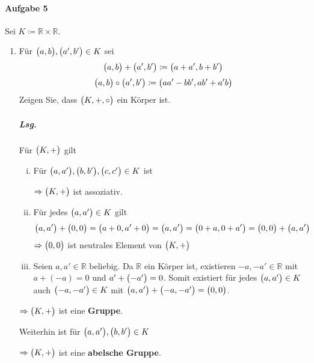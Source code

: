 \documentclass{scrreprt}
\begin{document}
\paragraph{Aufgabe 5} Sei $K \coloneqq \mathbb{R} \times \mathbb{R}$.
\begin{enumerate}[(1)]
\item Für $\qty\big(a, b), \qty\big(a', b') \in K$ sei
  \[
    \qty\big(a, b) + \qty\big(a', b') \coloneqq \qty\big(a + a', b + b')
  \]
  \[
    \qty\big(a, b) \circ \qty\big(a', b') \coloneqq
    \qty\big(aa' - bb', ab' + a'b)
  \]
  Zeigen Sie, dass $\qty\big(K, +, \circ)$ ein Körper ist.

  \subparagraph{Lsg.} Für $\qty\big(K, +)$ gilt
  \begin{enumerate}[(i)]
  \item Für $\qty\big(a, a'), \qty\big(b, b'), \qty\big(c, c') \in K$ ist
    $\Rightarrow \qty\big(K, +)$ ist assoziativ.

  \item Für jedes $\qty\big(a, a') \in K$ gilt
    \[
      \qty\big(a, a') + \qty\big(0, 0)
      = \qty\big(a + 0, a' + 0) = \qty\big(a, a')
      = \qty\big(0 + a, 0 + a')
      = \qty\big(0, 0) + \qty\big(a, a')
    \]
    $\Rightarrow \qty\big(0, 0)$ ist neutrales Element von $\qty\big(K, +)$

  \item Seien $a, a' \in \mathbb{R}$ beliebig.
    Da $\mathbb{R}$ ein Körper ist, existieren $-a, -a' \in \mathbb{R}$
    mit $a + (-a) = 0$ und $a' + \qty\big(-a') = 0$.
    Somit existiert für jedes $\qty\big(a, a') \in K$ auch
    $\qty\big(-a, -a') \in K$ mit
    $\qty\big(a, a') + \qty\big(-a, -a') = \qty\big(0, 0)$.
  \end{enumerate}

  $\Rightarrow \qty\big(K, +)$ ist eine \textbf{Gruppe}.

  Weiterhin ist für $\qty\big(a, a'), \qty\big(b, b') \in K$
  $\Rightarrow \qty\big(K, +)$ ist eine \textbf{abelsche Gruppe}.


\end{enumerate}
\end{document}
